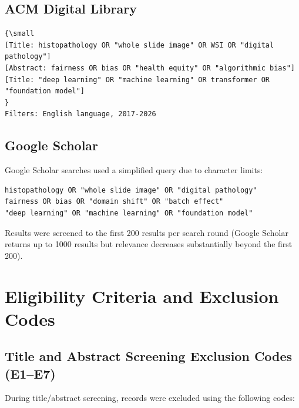 \subsection*{ACM Digital Library}

\begin{verbatim}
{\small
[Title: histopathology OR "whole slide image" OR WSI OR "digital pathology"] 
[Abstract: fairness OR bias OR "health equity" OR "algorithmic bias"] 
[Title: "deep learning" OR "machine learning" OR transformer OR "foundation model"]
}
Filters: English language, 2017-2026
\end{verbatim}

\subsection*{Google Scholar}

Google Scholar searches used a simplified query due to character limits:

\begin{verbatim}
histopathology OR "whole slide image" OR "digital pathology" 
fairness OR bias OR "domain shift" OR "batch effect"
"deep learning" OR "machine learning" OR "foundation model"
\end{verbatim}

Results were screened to the first 200 results per search round (Google Scholar returns up to 1000 results but relevance decreases substantially beyond the first 200).

\section{Eligibility Criteria and Exclusion Codes}
\label{app:methods:eligibility}

\subsection*{Title and Abstract Screening Exclusion Codes (E1--E7)}

During title/abstract screening, records were excluded using the following codes:

